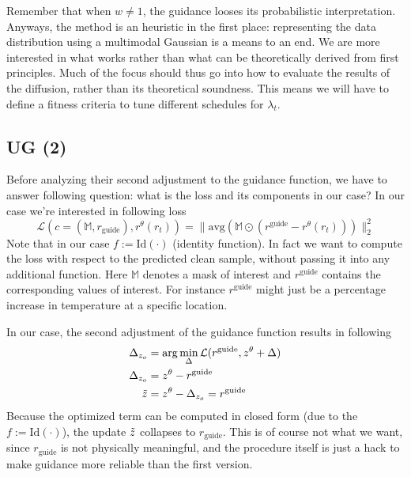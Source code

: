 \documentclass[a4paper,12pt]{article}
\begin{document}
Remember that when $w\neq1$, the guidance looses its probabilistic interpretation. Anyways, the method is an heuristic in the first place: representing the data distribution using a multimodal Gaussian is a means to an end. We are more interested in what works rather than what can be theoretically derived from first principles. Much of the focus should thus go into how to evaluate the results of the diffusion, rather than its theoretical soundness. This means we will have to define a fitness criteria to tune different schedules for $\lambda_t$.

\subsection{UG (2)}
Before analyzing their second adjustment to the guidance function, we have to answer following question: what is the loss and its components in our case?
In our case we're interested in following loss
$$
\mathcal{L}(c=(\mathbb{M},r_{\text{guide}}), r^\theta(r_t))=\| \text{avg}(\mathbb{M} \odot (r^{\text{guide}} - r^\theta(r_t)))\|^2_2
$$
Note that in our case $f:=\text{Id}(\cdot)$ (identity function). In fact we want to compute the loss with respect to the predicted clean sample, without passing it into any additional function.
Here $\mathbb{M}$ denotes a mask of interest and $r^{\text{guide}}$ contains the corresponding values of interest. For instance $r^{\text{guide}}$ might just be a percentage increase in temperature at a specific location.

In our case, the second adjustment of the guidance function results in following
\begin{align*}
    \Delta_{z_o} &= \arg\min_\Delta \mathcal{L}(r^{\text{guide}}, z^\theta + \Delta) \\
    \Delta_{z_o} &= z^\theta - r^{\text{guide}} \\
    \Tilde{z} &= z^\theta - \Delta_{z_o} = r^{\text{guide}}
\end{align*}
Because the optimized term can be computed in closed form (due to the $f:=\text{Id}(\cdot)$), the update $\Tilde{z}$ collapses to $r_{\text{guide}}$.
This is of course not what we want, since $r_{\text{guide}}$ is not physically meaningful, and the procedure itself is just a hack to make guidance more reliable than the first version.


% 
% 
\end{document}
